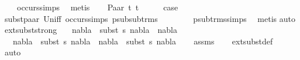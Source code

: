 \begin{isabellebody}
\ \ \ \ occurs{\isachardot}{\kern0pt}simps{\isacharparenleft}{\kern0pt}{}{\isacharparenright}{\kern0pt}\ \isamarkupfalse%
\ metis\isanewline
{}\isamarkupfalse%
\isanewline
\ \ \isamarkupfalse%
\ {\isacharparenleft}{\kern0pt}Paar\ t{}{}\ t{}{}{\isacharparenright}{\kern0pt}\isanewline
\ \ \isamarkupfalse%
\ \isamarkupfalse%
\ {\isacharquery}{\kern0pt}case\ \isanewline
\ \ \ \ \isamarkupfalse%
\ subst{\isacharunderscore}{\kern0pt}paar\ Un{\isacharunderscore}{\kern0pt}iff\ occurs{\isachardot}{\kern0pt}simps{\isacharparenleft}{\kern0pt}{}{\isacharparenright}{\kern0pt}\ psub{\isacharunderscore}{\kern0pt}sub{\isacharunderscore}{\kern0pt}trms\isanewline
\ \ \ \ \ \ \ \ psub{\isacharunderscore}{\kern0pt}trms{\isachardot}{\kern0pt}simps{\isacharparenleft}{\kern0pt}{}{\isacharparenright}{\kern0pt}\ \isamarkupfalse%
\ {\isacharparenleft}{\kern0pt}metis{\isacharparenright}{\kern0pt}\isanewline
{}\isamarkupfalse%
{\isacharparenleft}{\kern0pt}auto{\isacharparenright}{\kern0pt}%
\endisatagproof
{\isafoldproof}%
%
\isadelimproof
\isanewline
%
\endisadelimproof
\isanewline
{}\isamarkupfalse%
\ ext{\isacharunderscore}{\kern0pt}subst{\isacharunderscore}{\kern0pt}strong{\isacharcolon}{\kern0pt}\isanewline
\ \ \ {\isachardoublequoteopen}nabla{}\ {\isasymTurnstile}\ {\isacharparenleft}{\kern0pt}subst\ s{\isacharparenright}{\kern0pt}\ {\isacharparenleft}{\kern0pt}nabla{}\ {\isasymunion}\ nabla{}{\isacharparenright}{\kern0pt}{\isachardoublequoteclose}\isanewline
\ \ \ {\isachardoublequoteopen}nabla{}\ {\isasymTurnstile}\ {\isacharparenleft}{\kern0pt}subst\ s{\isacharparenright}{\kern0pt}\ nabla{}{\isachardoublequoteclose}\ \ {\isachardoublequoteopen}nabla{}\ {\isasymTurnstile}\ {\isacharparenleft}{\kern0pt}subst\ s{\isacharparenright}{\kern0pt}\ nabla{}{\isachardoublequoteclose}\isanewline
%
\isadelimproof
\ \ %
\endisadelimproof
%
\isatagproof
{}\isamarkupfalse%
\ assms\isanewline
\ \ \isamarkupfalse%
\ ext{\isacharunderscore}{\kern0pt}subst{\isacharunderscore}{\kern0pt}def\ \isamarkupfalse%
\ auto%
\endisatagproof
{\isafoldproof}%
%
\isadelimproof
\isanewline
%
\endisadelimproof
\isanewline
{}\isamarkupfalse%

\end{isabellebody}
